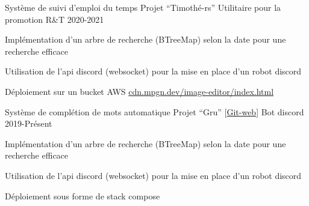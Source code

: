 \begin{cventries}
  \cventry
    {Système de suivi d'emploi du temps}
    {Projet ``Timothé-rs'' \href{https://github.com/MatthieuCoder/Timothe-rs.git}{\faGithubSquare}}
    {Utilitaire pour la promotion R\&T}
    {2020-2021}
    {
      \begin{cvitems}
        \item {Implémentation d'un arbre de recherche (BTreeMap) selon la date pour une recherche efficace} 
        \item {Utilisation de l'api discord (websocket) pour la mise en place d'un robot discord}
        \item {Déploiement sur un bucket AWS \href{https://cdn.mpgn.dev/image-editor/index.html}{cdn.mpgn.dev/image-editor/index.html}}
      \end{cvitems}
    }
  \cventry
    {Système de complétion de mots automatique}
    {Projet ``Gru'' [\href{https://git.puffer.fish/?p=matthieu/gru.git;a=summary}{Git-web}]}
    {Bot discord}
    {2019-Présent}
    {
      \begin{cvitems}
        \item {Implémentation d'un arbre de recherche (BTreeMap) selon la date pour une recherche efficace} 
        \item {Utilisation de l'api discord (websocket) pour la mise en place d'un robot discord}
        \item {Déploiement sous forme de stack compose}
      \end{cvitems}
    }
\end{cventries}
